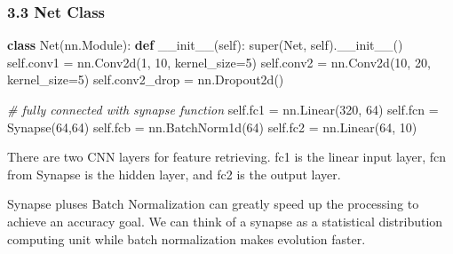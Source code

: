 \documentclass[
]{article}
\newenvironment{Shaded}{}{}
\newcommand{\BuiltInTok}[1]{#1}
\newcommand{\CommentTok}[1]{\textcolor[rgb]{0.38,0.63,0.69}{\textit{#1}}}
\newcommand{\DecValTok}[1]{\textcolor[rgb]{0.25,0.63,0.44}{#1}}
\newcommand{\FunctionTok}[1]{\textcolor[rgb]{0.02,0.16,0.49}{#1}}
\newcommand{\KeywordTok}[1]{\textcolor[rgb]{0.00,0.44,0.13}{\textbf{#1}}}
\newcommand{\NormalTok}[1]{#1}
\newcommand{\OperatorTok}[1]{\textcolor[rgb]{0.40,0.40,0.40}{#1}}
\newcommand{\VariableTok}[1]{\textcolor[rgb]{0.10,0.09,0.49}{#1}}
\begin{document}
\hypertarget{header-n57}{%
\subsubsection{3.3 Net Class}\label{header-n57}}

\begin{Shaded}
\begin{Highlighting}[]
\KeywordTok{class}\NormalTok{ Net(nn.Module):}
    \KeywordTok{def} \FunctionTok{\_\_init\_\_}\NormalTok{(}\VariableTok{self}\NormalTok{):}
        \BuiltInTok{super}\NormalTok{(Net, }\VariableTok{self}\NormalTok{).}\FunctionTok{\_\_init\_\_}\NormalTok{()}
        \VariableTok{self}\NormalTok{.conv1 }\OperatorTok{=}\NormalTok{ nn.Conv2d(}\DecValTok{1}\NormalTok{, }\DecValTok{10}\NormalTok{, kernel\_size}\OperatorTok{=}\DecValTok{5}\NormalTok{)}
        \VariableTok{self}\NormalTok{.conv2 }\OperatorTok{=}\NormalTok{ nn.Conv2d(}\DecValTok{10}\NormalTok{, }\DecValTok{20}\NormalTok{, kernel\_size}\OperatorTok{=}\DecValTok{5}\NormalTok{)}
        \VariableTok{self}\NormalTok{.conv2\_drop }\OperatorTok{=}\NormalTok{ nn.Dropout2d()}
        
        \CommentTok{\# fully connected with synapse function}
        \VariableTok{self}\NormalTok{.fc1 }\OperatorTok{=}\NormalTok{ nn.Linear(}\DecValTok{320}\NormalTok{, }\DecValTok{64}\NormalTok{)}
        \VariableTok{self}\NormalTok{.fcn }\OperatorTok{=}\NormalTok{ Synapse(}\DecValTok{64}\NormalTok{,}\DecValTok{64}\NormalTok{)}
        \VariableTok{self}\NormalTok{.fcb }\OperatorTok{=}\NormalTok{ nn.BatchNorm1d(}\DecValTok{64}\NormalTok{)}
        \VariableTok{self}\NormalTok{.fc2 }\OperatorTok{=}\NormalTok{ nn.Linear(}\DecValTok{64}\NormalTok{, }\DecValTok{10}\NormalTok{)}
\end{Highlighting}
\end{Shaded}

There are two CNN layers for feature retrieving. fc1 is the linear input
layer, fcn from Synapse is the hidden layer, and fc2 is the output
layer.

Synapse pluses Batch Normalization can greatly speed up the processing
to achieve an accuracy goal. We can think of a synapse as a statistical
distribution computing unit while batch normalization makes evolution
faster.
\end{document}
